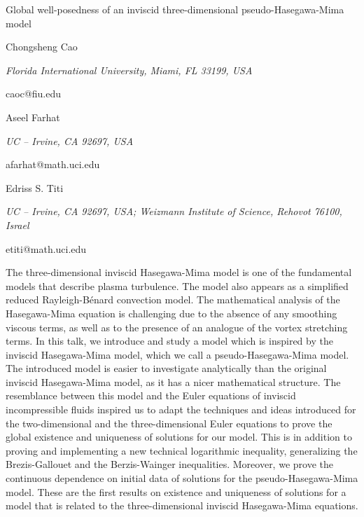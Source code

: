 \documentclass[10pt,a4paper]{article}
\begin{document}
\begin{center}

{\Large Global well-posedness of an inviscid three-dimensional pseudo-Hasegawa-Mima model}

\bigskip

{\sc Chongsheng Cao}

{\small\it Florida International University, Miami, FL 33199, USA}

{\small\rm caoc@fiu.edu}


\bigskip

{\sc Aseel Farhat}

{\small\it UC -- Irvine, CA 92697, USA}

{\small\rm  afarhat@math.uci.edu}

\bigskip

{\sc Edriss S. Titi}

{\small\it UC -- Irvine, CA 92697, USA; Weizmann Institute of Science, Rehovot 76100, Israel}

{\small\rm  etiti@math.uci.edu}

\end{center}

\bigskip

The three-dimensional inviscid Hasegawa-Mima model is one of the fundamental models that describe plasma turbulence. The model also appears as a simplified reduced Rayleigh-B\'enard convection model. The mathematical analysis of the Hasegawa-Mima equation is challenging  due to the absence of any smoothing viscous terms, as well as to the presence of an analogue of the vortex stretching terms. In this talk, we introduce and study a model which is inspired by the inviscid Hasegawa-Mima model, which we call a pseudo-Hasegawa-Mima model. The introduced model is easier to investigate analytically than the original inviscid Hasegawa-Mima model, as it has a nicer mathematical structure. The resemblance between this model and the Euler equations of inviscid incompressible fluids inspired us to adapt the techniques and ideas introduced for the two-dimensional and the three-dimensional Euler equations to prove the global existence and uniqueness of solutions for our model. This is in addition to proving and implementing a new technical logarithmic inequality, generalizing the Brezis-Gallouet and the Berzis-Wainger inequalities. Moreover, we prove the continuous dependence on initial data of solutions for the pseudo-Hasegawa-Mima model. These are the first results on existence and uniqueness of solutions for a model that is related to the three-dimensional inviscid Hasegawa-Mima equations.
\end{document}
